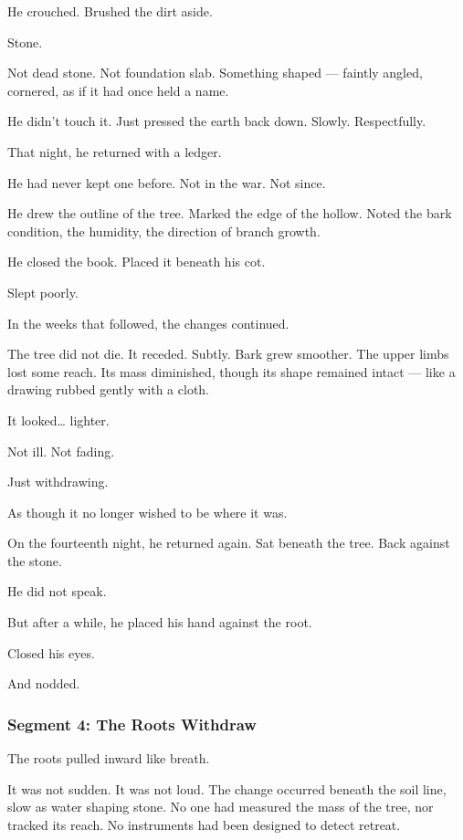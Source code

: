\documentclass[9pt]{article}
\begin{document}
He crouched. Brushed the dirt aside.

Stone.

Not dead stone. Not foundation slab. Something shaped --- faintly angled, cornered, as if it had once held a name.

He didn’t touch it. Just pressed the earth back down. Slowly. Respectfully.

\vspace{1em}

That night, he returned with a ledger.

He had never kept one before. Not in the war. Not since.

He drew the outline of the tree. Marked the edge of the hollow. Noted the bark condition, the humidity, the direction of branch growth.

He closed the book. Placed it beneath his cot.

Slept poorly.

\vspace{1em}

In the weeks that followed, the changes continued.

The tree did not die. It receded. Subtly. Bark grew smoother. The upper limbs lost some reach. Its mass diminished, though its shape remained intact --- like a drawing rubbed gently with a cloth.

It looked… lighter.

Not ill. Not fading.

Just withdrawing.

As though it no longer wished to be where it was.

\vspace{1em}

On the fourteenth night, he returned again. Sat beneath the tree. Back against the stone.

He did not speak.

But after a while, he placed his hand against the root.

Closed his eyes.

And nodded.

\newpage

\subsubsection*{Segment 4: The Roots Withdraw}

The roots pulled inward like breath.

It was not sudden. It was not loud. The change occurred beneath the soil line, slow as water shaping stone. No one had measured the mass of the tree, nor tracked its reach. No instruments had been designed to detect retreat.
\end{document}
